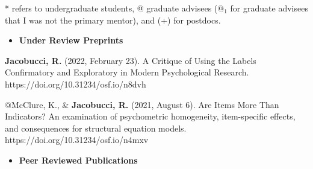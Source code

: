 \documentclass[letterpaper,10pt]{article}
\begin{document}
* refers to undergraduate students, @ graduate advisees ($@_{1}$ for graduate advisees that I was not the primary mentor), and (+) for postdocs.
\begin{itemize} 
	\setlength{\topsep}{0pt}%
	\setlength{\leftmargin}{0.1in}%
	\setlength{\listparindent}{-0.1in}%
	\setlength{\itemindent}{-0.2in}%
	\setlength{\parsep}{\parskip}%
	
	\item {\textbf{\large{Under Review Preprints}}}
\end{itemize}
\begin{etaremune}
\item \textbf{Jacobucci, R.} (2022, February 23). A Critique of Using the Labels Confirmatory and Exploratory in Modern Psychological Research. https://doi.org/10.31234/osf.io/n8dvh

\item $@$McClure, K., \& \textbf{Jacobucci, R.} (2021, August 6). Are Items More Than Indicators? An examination of psychometric homogeneity, item-specific effects, and consequences for structural equation models. https://doi.org/10.31234/osf.io/n4mxv



	
	\end{etaremune}
\vspace{3mm}
\begin{itemize}
	\item {\textbf{\large{Peer Reviewed Publications}}}
\end{itemize}
\end{document}
